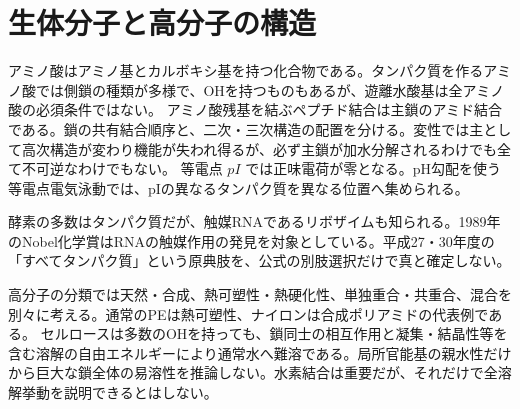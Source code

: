 \section{生体分子と高分子の構造}\label{theory:organic:biomolecules}
アミノ酸はアミノ基とカルボキシ基を持つ化合物である。タンパク質を作るアミノ酸では側鎖の種類が多様で、OHを持つものもあるが、遊離水酸基は全アミノ酸の必須条件ではない\cite{analysis49_amino_ref}。
アミノ酸残基を結ぶペプチド結合は主鎖のアミド結合である。鎖の共有結合順序と、二次・三次構造の配置を分ける。変性では主として高次構造が変わり機能が失われ得るが、必ず主鎖が加水分解されるわけでも全て不可逆なわけでもない。
等電点 \(pI\) では正味電荷が零となる。pH勾配を使う等電点電気泳動では、pIの異なるタンパク質を異なる位置へ集められる。

酵素の多数はタンパク質だが、触媒RNAであるリボザイムも知られる。1989年のNobel化学賞はRNAの触媒作用の発見を対象としている\cite{analysis49_rna_ref}。平成27・30年度の「すべてタンパク質」という原典肢を、公式の別肢選択だけで真と確定しない。

高分子の分類では天然・合成、熱可塑性・熱硬化性、単独重合・共重合、混合を別々に考える。通常のPEは熱可塑性、ナイロンは合成ポリアミドの代表例である\cite{organic_physical,organic_step}。
セルロースは多数のOHを持っても、鎖同士の相互作用と凝集・結晶性等を含む溶解の自由エネルギーにより通常水へ難溶である\cite{analysis49_cellulose_ref}。局所官能基の親水性だけから巨大な鎖全体の易溶性を推論しない。水素結合は重要だが、それだけで全溶解挙動を説明できるとはしない。
